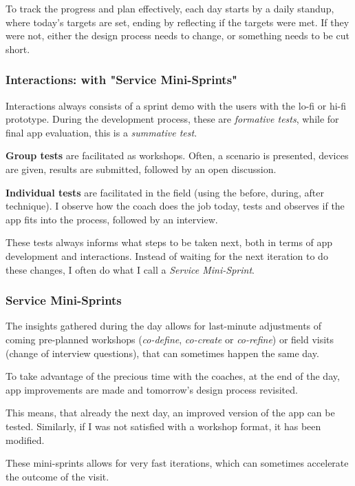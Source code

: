   To track the progress and plan effectively, each day starts by a daily standup, where today's targets are set, ending by reflecting if the targets were met. If they were not, either the design process needs to change, or something needs to be cut short.

  \subsubsection{Interactions: with "Service Mini-Sprints"}
  Interactions always consists of a sprint demo with the users with the lo-fi or hi-fi prototype. During the development process, these are \textit{formative tests}, while for final app evaluation, this is a \textit{summative test}.

    \textbf{Group tests} are facilitated as workshops. Often, a scenario is presented, devices are given, results are submitted, followed by an open discussion.

    \textbf{Individual tests} are facilitated in the field (using the before, during, after technique). I observe how the coach does the job today, tests and observes if the app fits into the process, followed by an interview.

    These tests always informs what steps to be taken next, both in terms of app development and interactions. Instead of waiting for the next iteration to do these changes, I often do what I call a \textit{Service Mini-Sprint}.

    \subsubsection{Service Mini-Sprints}
    The insights gathered during the day allows for last-minute adjustments of coming pre-planned workshops (\textit{co-define}, \textit{co-create} or \textit{co-refine}) or field visits (change of interview questions), that can sometimes happen the same day.

    To take advantage of the precious time with the coaches, at the end of the day, app improvements are made and tomorrow's design process revisited.

    This means, that already the next day, an improved version of the app can be tested. Similarly, if I was not satisfied with a workshop format, it has been modified.

    These mini-sprints allows for very fast iterations, which can sometimes accelerate the outcome of the visit.
